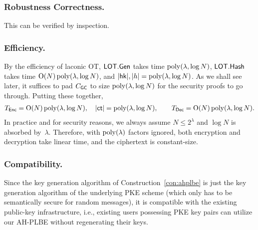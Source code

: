 \subsubsection{Robustness Correctness.}
This can be verified by inspection.

\subsubsection{Efficiency.}
By the efficiency of laconic OT,
${\smash{\mathsf{LOT}}}.{\smash{\mathsf{Gen}}}$ takes time $\operatorname{poly}(\lambda,\log N)$,
${\smash{\mathsf{LOT}}}.{\smash{\mathsf{Hash}}}$ takes time $\operatorname{O}(N)\operatorname{poly}(\lambda,\log N)$, and
${|{\smash{\mathsf{hk}}}|,|h|=\operatorname{poly}(\lambda,\log N)}$.
As we shall see later, it suffices to pad $C_{\smash{\mathsf{GC}}}$ to size $\operatorname{poly}(\lambda,\log N)$ for the security proofs to go through.
Putting these together,
\begin{align*}
T_\Enc
\WideNarrow{}{&{}}
=\bigO(N)\poly(\lambda,\log N),
\WideNarrow{\quad}{\qquad}
|\ct|=\poly(\lambda,\log N),
\WideNarrow{\qquad}{\\}
T_\Dec
\WideNarrow{}{&{}}
=\bigO(N)\poly(\lambda,\log N).
\end{align*}
In practice and for security reasons,
we always assume ${N\leq 2^\lambda}$ and ${\log N}$ is absorbed by~$\lambda$.
Therefore, with $\operatorname{poly}(\lambda)$ factors ignored,
both encryption and decryption take linear time,
and the ciphertext is constant-size.

\subsubsection{Compatibility.}
Since the key generation algorithm of Construction~\ref{con:ahplbe} is just the key generation algorithm of the underlying PKE scheme (which only has to be semantically secure for random messages),
it is compatible with the existing public-key infrastructure,
i.e., existing users possessing PKE key pairs can utilize our AH-PLBE without regenerating their keys.
